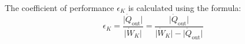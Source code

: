 The coefficient of performance \( \epsilon_K \) is calculated using the formula:  
\[
\epsilon_K = \frac{\lvert \dot{Q}_{\text{out}} \rvert}{\lvert \dot{W}_K \rvert} = \frac{\lvert \dot{Q}_{\text{out}} \rvert}{\lvert \dot{W}_K \rvert - \lvert \dot{Q}_{\text{out}} \rvert}
\]